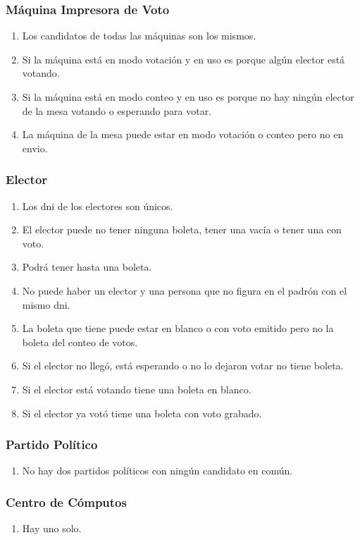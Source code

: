 \subsubsection*{M\'aquina Impresora de Voto}
\begin{enumerate}
\item Los candidatos de todas las máquinas son los mismos.
\item Si la máquina está en modo votación y en uso es porque algún elector está votando.
\item Si la máquina está en modo conteo y en uso es porque no hay ningún elector de la mesa votando o esperando para votar.
\item La máquina de la mesa puede estar en modo votación o conteo pero no en envio.
\end{enumerate}

\subsubsection*{Elector}
\begin{enumerate}
\item Los dni de los     electores son únicos.
\item El elector puede no tener ninguna boleta, tener una vacía o tener una con voto.     \item Podrá tener hasta una boleta.
\item No puede haber un elector y una persona que no figura en el padrón con el mismo dni.
\item La boleta que tiene puede estar en blanco o con voto emitido pero no la boleta del conteo de votos.
\item Si el elector no llegó, está esperando o no lo dejaron votar no tiene boleta.
\item Si el elector está votando tiene una boleta en blanco.
\item Si el elector ya votó tiene una boleta con voto grabado.
\end{enumerate}

\subsubsection*{Partido Pol\'itico}
\begin{enumerate}
\item No hay dos partidos políticos con ningún candidato en común.
\end{enumerate}

\subsubsection*{Centro de C\'omputos}
\begin{enumerate}
\item Hay uno solo.
\end{enumerate}

